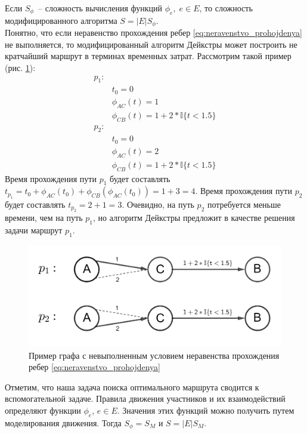 \documentclass[12pt, a4paper]{article}
\begin{document}
	Если $S_{\phi}$~-- сложность вычисления функций $\phi_e, \; e \in E$, то сложность модифицированного алгоритма $S = |E|S_{\phi}.$\\
	
	Понятно, что если неравенство прохождения ребер \eqref{eq:neravenstvo_prohojdenya} не выполняется, то модифицированный алгоритм Дейкстры может построить не кратчайший маршрут в терминах временных затрат. Рассмотрим такой пример (рис. \ref{ris:deikstra}):
	\begin{align*}
		p_1: & \\
		& t_0 = 0 \\
		& \phi_{AC}(t) = 1  \\
		& \phi_{CB}(t) = 1 + 2 * \mathbb{I} \{t < 1.5\} \\
		p_2: & \\
		& t_0 = 0 \\
		& \phi_{AC}(t) = 2  \\
		& \phi_{CB}(t) = 1 + 2 * \mathbb{I} \{t < 1.5\} 
	\end{align*}
	Время прохождения пути $p_1$ будет составлять $t_{p_1} = t_0 + \phi_{AC}(t_0) + \phi_{CB}(\phi_{AC}(t_0)) = 1 + 3 = 4 $. Время прохождения пути $p_2$ будет составлять $t_{p_2} = 2 + 1 = 3 $. Очевидно, на путь $p_2$ потребуется меньше времени, чем на путь $p_1$, но алгоритм Дейкстры предложит в качестве решения задачи маршрут $p_1$.
	
	\begin{figure}[H]
		\centering
		\includegraphics[scale=0.2]{graph_2.png}
		\caption{Пример графа с невыполненным условием неравенства прохождения ребер \eqref{eq:neravenstvo_prohojdenya}}
		\label{ris:deikstra}
	\end{figure}
	
	Отметим, что наша задача поиска оптимального маршрута сводится к вспомогательной задаче. Правила движения участников и их взаимодействий определяют функции $\phi_e$, $e \in E $. Значения этих функций можно получить путем моделирования движения. Тогда $S_{\phi} = S_M$ и $S = |E|S_M$.
	
\end{document}
